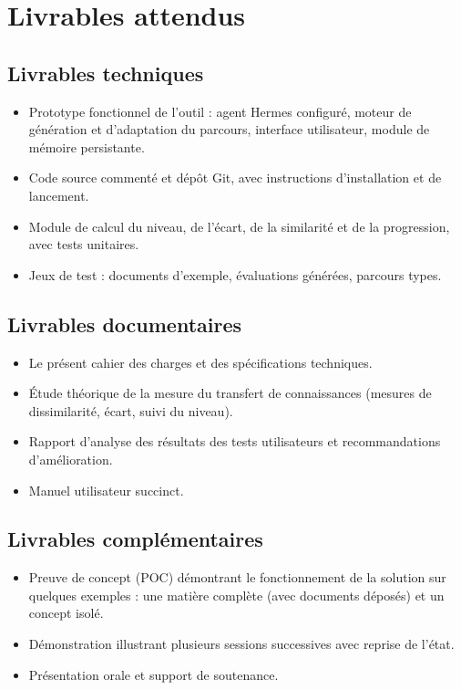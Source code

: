 \documentclass[11pt,a4paper]{article}
\begin{document}
\section{Livrables attendus}

\subsection{Livrables techniques}
\begin{itemize}[noitemsep]
  \item Prototype fonctionnel de l'outil : agent Hermes configuré, moteur de génération et d'adaptation du parcours, interface utilisateur, module de mémoire persistante.
  \item Code source commenté et dépôt Git, avec instructions d'installation et de lancement.
  \item Module de calcul du niveau, de l'écart, de la similarité et de la progression, avec tests unitaires.
  \item Jeux de test : documents d'exemple, évaluations générées, parcours types.
\end{itemize}

\subsection{Livrables documentaires}
\begin{itemize}[noitemsep]
  \item Le présent cahier des charges et des spécifications techniques.
  \item Étude théorique de la mesure du transfert de connaissances (mesures de dissimilarité, écart, suivi du niveau).
  \item Rapport d'analyse des résultats des tests utilisateurs et recommandations d'amélioration.
  \item Manuel utilisateur succinct.
\end{itemize}

\subsection{Livrables complémentaires}
\begin{itemize}[noitemsep]
  \item Preuve de concept (POC) démontrant le fonctionnement de la solution sur quelques exemples : une matière complète (avec documents déposés) et un concept isolé.
  \item Démonstration illustrant plusieurs sessions successives avec reprise de l'état.
  \item Présentation orale et support de soutenance.
\end{itemize}
\end{document}
